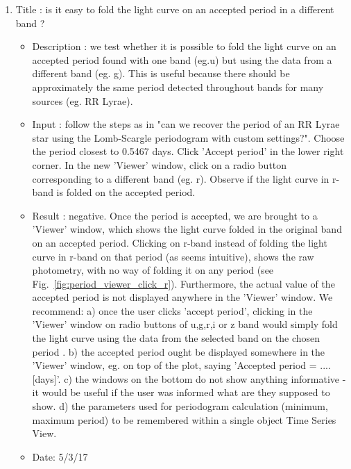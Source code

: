 \documentclass[DM,lsstdraft,toc]{lsstdoc}
\begin{document}
\begin{enumerate}
   \item Title : is it easy to fold the light curve on an accepted period in a different band ?
    \begin{itemize}
      \item Description : we test whether it is possible to fold the light curve on an accepted period found with one band (eg.u) but using the data from a different band (eg. g).  This is useful because there should be approximately the same period detected throughout bands for many sources (eg. RR Lyrae).
      \item Input : follow the steps as in "can we recover the period of an RR Lyrae  star using the Lomb-Scargle periodogram with custom settings?".  Choose the period closest to 0.5467 days. Click 'Accept period' in the lower right corner.  In the new 'Viewer' window, click on a radio button corresponding to a different band (eg. r). Observe if the light curve in r-band is folded on the accepted period.
      \item Result : negative.  Once the period is accepted, we are brought to a 'Viewer' window, which shows the light curve folded in the original band on an accepted period. Clicking on r-band instead of folding the light curve in r-band on that period (as seems intuitive), shows the raw photometry, with no way of folding it on any period (see Fig.~\ref{fig:period_viewer_click_r}).  Furthermore, the actual value of the accepted period is not displayed anywhere in the 'Viewer' window. We recommend:
      a) once  the user clicks 'accept period', clicking in the 'Viewer' window on radio buttons of u,g,r,i or z  band would simply fold the light curve  using the data from the selected band on the chosen period .
      b) the accepted period ought be displayed somewhere in the 'Viewer' window, eg. on top of the plot, saying 'Accepted period = .... [days]'.
      c) the windows on the bottom do not show anything informative - it would be useful if the user was informed what are they supposed to show.
      d) the parameters used for  periodogram calculation (minimum, maximum period) to be remembered within a single object Time Series View.
      \item Date: 5/3/17
    \end{itemize}


\end{enumerate}
\end{document}
